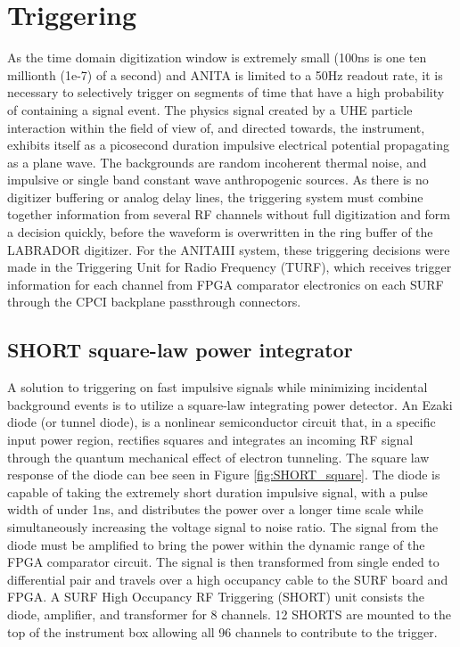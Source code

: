 		
\section{Triggering}
	As the time domain digitization window is extremely small (100ns is one ten millionth (1e-7) of a second) and ANITA is limited to a 50Hz readout rate, it is necessary to selectively trigger on segments of time that have a high probability of containing a signal event.  The physics signal created by a UHE particle interaction within the field of view of, and directed towards, the instrument, exhibits itself as a picosecond duration impulsive electrical potential propagating as a plane wave.  The backgrounds are random incoherent thermal noise, and impulsive or single band constant wave anthropogenic sources.  As there is no digitizer buffering or analog delay lines, the triggering system must combine together information from several RF channels without full digitization and form a decision quickly, before the waveform is overwritten in the ring buffer of the LABRADOR digitizer.  For the ANITAIII system, these triggering decisions were made in the Triggering Unit for Radio Frequency (TURF), which receives trigger information for each channel from FPGA comparator electronics on each SURF through the CPCI backplane passthrough connectors.
	
	\subsection{SHORT square-law power integrator}
		A solution to triggering on fast impulsive signals while minimizing incidental background events is to utilize a square-law integrating power detector.  An Ezaki diode (or tunnel diode)\cite{Esaki}, is a nonlinear semiconductor circuit that, in a specific input power region, rectifies squares and integrates an incoming RF signal through the quantum mechanical effect of electron tunneling.  The square law response of the diode can bee seen in Figure \ref{fig:SHORT_square}.  The diode is capable of taking the extremely short duration impulsive signal, with a pulse width of under 1ns, and distributes the power over a longer time scale while simultaneously increasing the voltage signal to noise ratio.  The signal from the diode must be amplified to bring the power within the dynamic range of the FPGA comparator circuit.  The signal is then transformed from single ended to differential pair and travels over a high occupancy cable to the SURF board and FPGA.  A SURF High Occupancy RF Triggering (SHORT) unit consists the diode, amplifier, and transformer for 8 channels.  12 SHORTS are mounted to the top of the instrument box allowing all 96 channels to contribute to the trigger.
		
